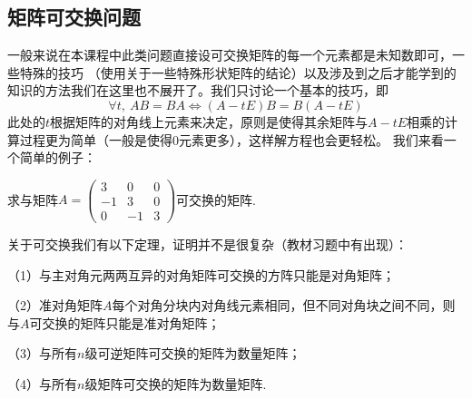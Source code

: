 \subsection{矩阵可交换问题}
一般来说在本课程中此类问题直接设可交换矩阵的每一个元素都是未知数即可，一些特殊的技巧
（使用关于一些特殊形状矩阵的结论）以及涉及到之后才能学到的知识的方法我们在这里也不展开了。我们只讨论一个基本的技巧，即
$$\forall t,\ AB=BA \iff (A-tE)B=B(A-tE)$$
此处的$t$根据矩阵的对角线上元素来决定，原则是使得其余矩阵与$A-tE$相乘的计算过程更为简单（一般是使得0元素更多），这样解方程也会更轻松。
我们来看一个简单的例子：
\begin{example}
	求与矩阵$A=\begin{pmatrix}
		3 & 0 & 0 \\ -1 & 3 & 0 \\ 0 & -1 & 3
	\end{pmatrix}$可交换的矩阵.
\end{example}

关于可交换我们有以下定理，证明并不是很复杂（教材习题中有出现）：
\begin{theorem}
	\textup{（1）}与主对角元两两互异的对角矩阵可交换的方阵只能是对角矩阵；

	\textup{（2）}准对角矩阵$A$每个对角分块内对角线元素相同，但不同对角块之间不同，则与$A$可交换的矩阵只能是准对角矩阵；
	
	\textup{（3）}与所有$n$级可逆矩阵可交换的矩阵为数量矩阵；
	
	\textup{（4）}与所有$n$级矩阵可交换的矩阵为数量矩阵.
\end{theorem}


